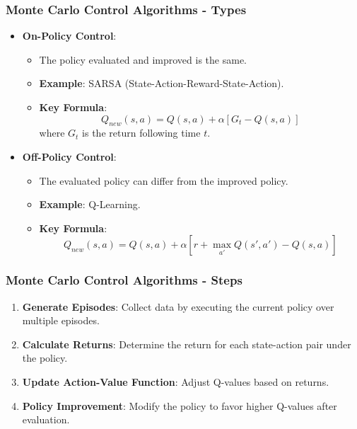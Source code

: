 \documentclass[aspectratio=169]{beamer}
\begin{document}
\begin{frame}[fragile]
    \frametitle{Monte Carlo Control Algorithms - Types}
    \begin{itemize}
        \item \textbf{On-Policy Control}:
        \begin{itemize}
            \item The policy evaluated and improved is the same.
            \item \textbf{Example}: SARSA (State-Action-Reward-State-Action).
            \item \textbf{Key Formula}:
            \begin{equation}
                Q_{new}(s, a) = Q(s, a) + \alpha [G_t - Q(s, a)]
            \end{equation}
            where \( G_t \) is the return following time \( t \).
        \end{itemize}
        
        \item \textbf{Off-Policy Control}:
        \begin{itemize}
            \item The evaluated policy can differ from the improved policy.
            \item \textbf{Example}: Q-Learning.
            \item \textbf{Key Formula}:
            \begin{equation}
                Q_{new}(s, a) = Q(s, a) + \alpha [r + \max_{a'} Q(s', a') - Q(s, a)]
            \end{equation}
        \end{itemize}
    \end{itemize}
\end{frame}

\begin{frame}[fragile]
    \frametitle{Monte Carlo Control Algorithms - Steps}
    \begin{enumerate}
        \item \textbf{Generate Episodes}: Collect data by executing the current policy over multiple episodes.
        \item \textbf{Calculate Returns}: Determine the return for each state-action pair under the policy.
        \item \textbf{Update Action-Value Function}: Adjust Q-values based on returns.
        \item \textbf{Policy Improvement}: Modify the policy to favor higher Q-values after evaluation.
    \end{enumerate}
\end{frame}
\end{document}
